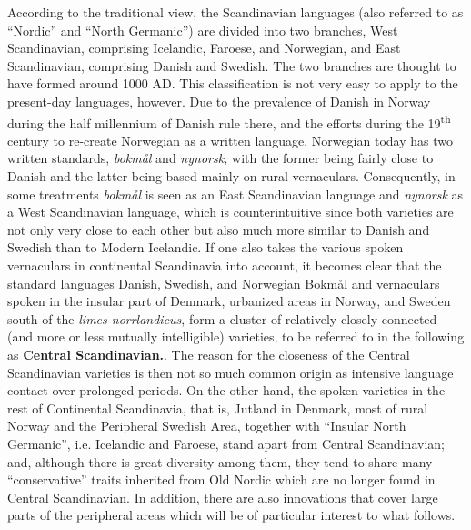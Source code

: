 \begin{styleBodyTextFirst}
According to the traditional view, the Scandinavian languages (also referred to as “Nordic” and “North Germanic”) are divided into two branches, West Scandinavian, comprising Icelandic, Faroese, and Norwegian, and East Scandinavian, comprising Danish and Swedish. The two branches are thought to have formed around 1000 AD. This classification is not very easy to apply to the present-day languages, however. Due to the prevalence of Danish in Norway during the half millennium of Danish rule there, and the efforts during the 19\textsuperscript{th} century to re-create Norwegian as a written language, Norwegian today has two written standards, \textit{bokmål} and \textit{nynorsk,} with the former being fairly close to Danish and the latter being based mainly on rural vernaculars. Consequently, in some treatments \textit{bokmål} is seen as an East Scandinavian language and \textit{nynorsk} as a West Scandinavian language, which is counterintuitive since both varieties are not only very close to each other but also much more similar to Danish and Swedish than to Modern Icelandic. If one also takes the various spoken vernaculars in continental Scandinavia into account, it becomes clear that the standard languages Danish, Swedish, and Norwegian Bokmål and vernaculars spoken in the insular part of Denmark, urbanized areas in Norway, and Sweden south of the \textit{limes norrlandicus}, form a cluster of relatively closely connected (and more or less mutually intelligible) varieties, to be referred to in the following as \textbf{Central Scandinavian.}. The reason for the closeness of the Central Scandinavian varieties is then not so much common origin as intensive language contact over prolonged periods. On the other hand, the spoken varieties in the rest of Continental Scandinavia, that is, Jutland in Denmark, most of rural Norway and the Peripheral Swedish Area, together with “Insular North Germanic”, i.e. Icelandic and Faroese, stand apart from Central Scandinavian; and, although there is great diversity among them, they tend to share many “conservative” traits inherited from Old Nordic which are no longer found in Central Scandinavian. In addition, there are also innovations that cover large parts of the peripheral areas which will be of particular interest to what follows. 

\end{styleBodyTextFirst}

